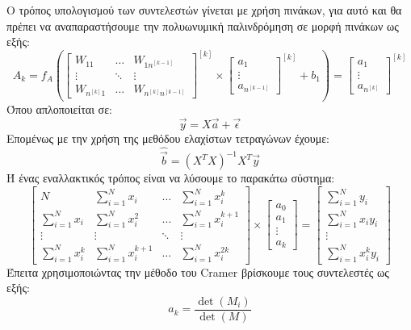 Ο τρόπος υπολογισμού των συντελεστών γίνεται με χρήση πινάκων, για αυτό και θα πρέπει
να αναπαραστήσουμε την πολυωνυμική παλινδρόμηση σε μορφή πινάκων ως εξής:
$$
A_k=f_A\left(
\begin{bmatrix}
    W_{11}     & \dots     & W_{1n^{[k-1]}} \\
    \vdots     & \ddots    & \vdots \\
    W_{n^{[k]}1}   & \dots     & W_{n^{[k]}n^{[k-1]}}
\end{bmatrix}
^{[k]}
\times
\begin{bmatrix}
    a_1 \\
    \vdots \\
    a_{n^{[k-1]}}
\end{bmatrix}
^{[k]}
+
b_1
\right)
=
\begin{bmatrix}
    a_1 \\
    \vdots \\
    a_{n^{[k]}}
\end{bmatrix}
^{[k]}
$$
Όπου απλοποιείται σε:
$$\overrightarrow{y}=X\overrightarrow{a}+\overrightarrow{\epsilon}$$
Επομένως με την χρήση της μεθόδου ελαχίστων τετραγώνων έχουμε:
$$\widehat{\overrightarrow{b}}=(X^TX)^{-1}X^T\overrightarrow{y}$$
Ή ένας εναλλακτικός τρόπος είναι να λύσουμε το παρακάτω σύστημα:
$$
\begin{bmatrix}
    N       & \sum\limits_{i=1}^Nx_i    & \dots     & \sum\limits_{i=1}^Nx_i^k \\
    \sum\limits_{i=1}^Nx_i   & \sum\limits_{i=1}^Nx_i^2       & \dots     & \sum\limits_{i=1}^Nx_i^{k+1} \\
    \vdots  & \vdots    & \ddots    & \vdots \\
    \sum\limits_{i=1}^Nx_i^k   & \sum\limits_{i=1}^Nx_i^{k+1}    & \dots     & \sum\limits_{i=1}^Nx_i^{2k}
\end{bmatrix}
\times
\begin{bmatrix}
    a_0 \\
    a_1 \\
    \vdots \\
    a_k
\end{bmatrix}
=
\begin{bmatrix}
    \sum\limits_{i=1}^Ny_i  \\
    \sum\limits_{i=1}^Nx_iy_i \\
    \vdots \\
    \sum\limits_{i=1}^Nx_i^ky_i
\end{bmatrix}
$$
Έπειτα χρησιμοποιώντας την μέθοδο του Cramer βρίσκουμε τους συντελεστές ως εξής:
$$a_k=\frac{\det (M_i)}{\det (M)}$$
